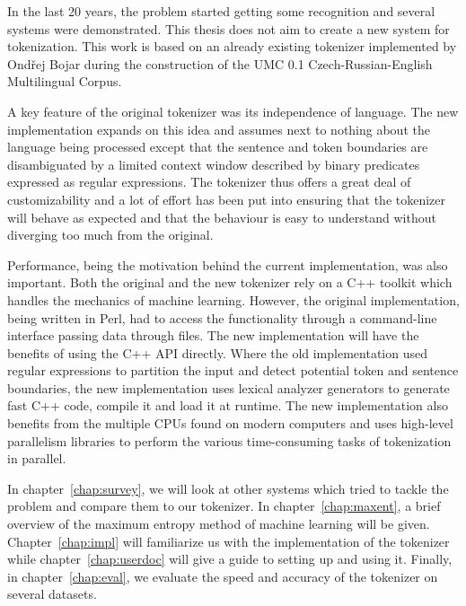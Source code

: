 In the last 20 years, the problem started getting some recognition and several
systems were demonstrated. This thesis does not aim to create a new system for
tokenization. This work is based on an already existing tokenizer implemented
by Ondřej Bojar during the construction of the UMC 0.1 Czech-Russian-English
Multilingual Corpus.

A key feature of the original tokenizer was its independence of language. The
new implementation expands on this idea and assumes next to nothing about the
language being processed except that the sentence and token boundaries are
disambiguated by a limited context window described by binary predicates
expressed as regular expressions. The tokenizer thus offers a great deal of
customizability and a lot of effort has been put into ensuring that the
tokenizer will behave as expected and that the behaviour is easy to understand
without diverging too much from the original.

Performance, being the motivation behind the current implementation, was also
important. Both the original and the new tokenizer rely on a C++ toolkit which
handles the mechanics of machine learning. However, the original
implementation, being written in Perl, had to access the functionality through
a command-line interface passing data through files. The new implementation
will have the benefits of using the C++ API directly. Where the old
implementation used regular expressions to partition the input and detect
potential token and sentence boundaries, the new implementation uses lexical
analyzer generators to generate fast C++ code, compile it and load it at
runtime. The new implementation also benefits from the multiple CPUs found on
modern computers and uses high-level parallelism libraries to perform the
various time-consuming tasks of tokenization in parallel.

In chapter~\ref{chap:survey}, we will look at other systems which tried to
tackle the problem and compare them to our tokenizer. In
chapter~\ref{chap:maxent}, a brief overview of the maximum entropy method of
machine learning will be given. Chapter~\ref{chap:impl} will familiarize us
with the implementation of the tokenizer while chapter~\ref{chap:userdoc} will
give a guide to setting up and using it. Finally, in chapter~\ref{chap:eval},
we evaluate the speed and accuracy of the tokenizer on several datasets.
